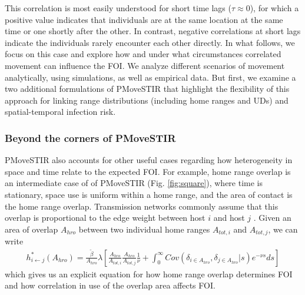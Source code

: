 \documentclass[letterpaper]{article}
\begin{document}
This correlation is most easily understood for short time lags ($\tau\approx0$), for which a positive value indicates that individuals are at the same location at the same time or one shortly after the other. In contrast, negative correlations at short lags indicate the individuals rarely encounter each other directly.
In what follows, we focus on this case and explore how and under what circumstances correlated movement can influence the FOI. We analyze different scenarios of movement analytically, using simulations, as well as empirical data.  But first, we examine a two additional formulations of PMoveSTIR that highlight the flexibility of this approach for linking range distributions (including home ranges and UDs) and spatial-temporal infection risk.





\subsubsection*{Beyond the corners of PMoveSTIR}

PMoveSTIR also accounts for other useful cases regarding how heterogeneity in space and time relate to the expected FOI. For example, home range overlap is an intermediate case of of PMoveSTIR (Fig. \ref{fig:square}), where time is stationary, space use is uniform within a home range, and the area of contact is the home range overlap.  
Transmission networks commonly assume that this overlap is proportional to the edge weight between host $i$ and host $j$ \citep[e.g.][]{Springer2017a}. 
Given an area of overlap $A_{hro}$ between two individual home ranges $A_{tot, i}$ and $A_{tot, j}$, we can write
\begin{equation}
    \begin{aligned}
    h^*_{i \leftarrow j}(A_{hro}) = \frac{\tilde{\beta}}{A_{hro}} \lambda \left[\frac{A_{hro}}{A_{tot, i}} \frac{A_{hro}}{A_{tot, j}}  \frac{1}{\nu} + \int_{0}^{\infty} Cov(\delta_{i \in A_{hro}}, \delta_{j \in A_{hro}} | s) e^{-\nu s} ds\right]
    \end{aligned}
    \label{eq:home_range}
\end{equation}
which gives us an explicit equation for how home range overlap determines FOI and how correlation in use of the overlap area affects FOI. 
\end{document}
